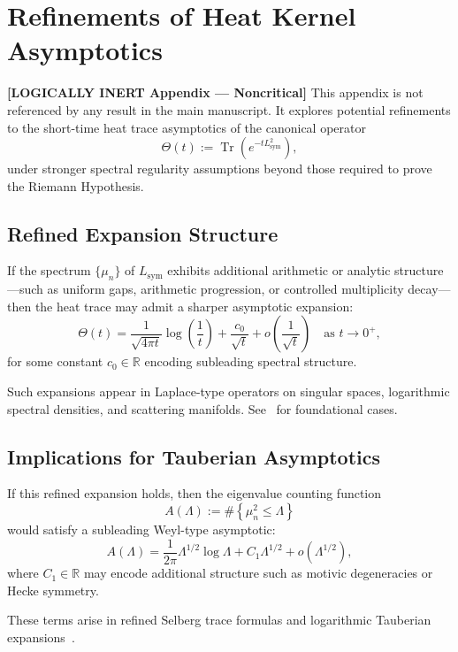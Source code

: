 \section{Refinements of Heat Kernel Asymptotics}
\label{app:heat-kernel-refinements}

\noindent\textbf{[LOGICALLY INERT Appendix — Noncritical]}  
This appendix is not referenced by any result in the main manuscript. It explores potential refinements to the short-time heat trace asymptotics of the canonical operator
\[
\Theta(t) := \operatorname{Tr}(e^{-t L_{\mathrm{sym}}^2}),
\]
under stronger spectral regularity assumptions beyond those required to prove the Riemann Hypothesis.

\subsection*{Refined Expansion Structure}

If the spectrum \( \{\mu_n\} \) of \( L_{\mathrm{sym}} \) exhibits additional arithmetic or analytic structure—such as uniform gaps, arithmetic progression, or controlled multiplicity decay—then the heat trace may admit a sharper asymptotic expansion:
\[
\Theta(t) = \frac{1}{\sqrt{4\pi t}} \log\left( \frac{1}{t} \right)
+ \frac{c_0}{\sqrt{t}} + o\left( \frac{1}{\sqrt{t}} \right)
\quad \text{as } t \to 0^+,
\]
for some constant \( c_0 \in \mathbb{R} \) encoding subleading spectral structure.

Such expansions appear in Laplace-type operators on singular spaces, logarithmic spectral densities, and scattering manifolds. See~\cite{Seeley1967ComplexPowers, Gilkey1995Invariance, Vaillant2001HeatKernel} for foundational cases.

\subsection*{Implications for Tauberian Asymptotics}

If this refined expansion holds, then the eigenvalue counting function
\[
A(\Lambda) := \#\left\{ \mu_n^2 \le \Lambda \right\}
\]
would satisfy a subleading Weyl-type asymptotic:
\[
A(\Lambda) = \frac{1}{2\pi} \Lambda^{1/2} \log \Lambda + C_1 \Lambda^{1/2} + o(\Lambda^{1/2}),
\]
where \( C_1 \in \mathbb{R} \) may encode additional structure such as motivic degeneracies or Hecke symmetry.

These terms arise in refined Selberg trace formulas and logarithmic Tauberian expansions~\cite{Korevaar2004Tauberian}.

